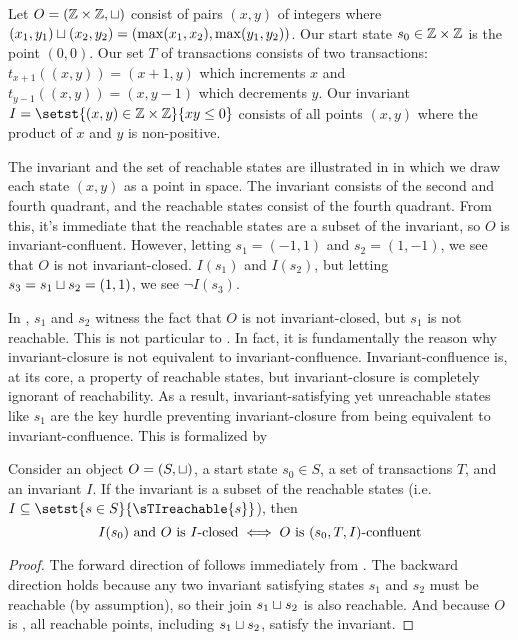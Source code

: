 \begin{example}
  Let $O = (\mathbb{Z} \times \mathbb{Z}, \sqcup)$ consist of pairs $(x, y)$ of integers
  where $(x_1, y_1) \sqcup (x_2, y_2) = (\max(x_1, x_2), \max(y_1, y_2))$. Our
  start state $s_0 \in \mathbb{Z} \times \mathbb{Z}$ is the point $(0, 0)$. Our set $T$
  of transactions consists of two transactions: $t_{x+1}((x, y)) = (x + 1, y)$
  which increments $x$ and $t_{y-1}((x, y)) = (x, y - 1)$ which decrements $y$.
  Our invariant $I = \setst{(x, y) \in \ints \times \ints}{xy \leq 0}$ consists
  of all points $(x, y)$ where the product of $x$ and $y$ is non-positive.

  The invariant and the set of reachable states are illustrated in 
  in which we draw each state $(x, y)$ as a point in space. The invariant
  consists of the second and fourth quadrant, and the reachable states consist
  of the fourth quadrant. From this, it's immediate that the reachable states
  are a subset of the invariant, so $O$ is invariant-confluent. However,
  letting $s_1 = (-1, 1)$ and $s_2 = (1, -1)$, we see that $O$ is not
  invariant-closed. $I(s_1)$ and $I(s_2)$, but letting $s_3 = s_1 \sqcup s_2 =
  (1, 1)$, we see $\lnot I(s_3)$.
\end{example}

{}

In , $s_1$ and $s_2$ witness the fact that $O$ is not
invariant-closed, but $s_1$ is not reachable. This is not particular to
. In fact, it is fundamentally the reason why invariant-closure
is not equivalent to invariant-confluence. Invariant-confluence is, at its
core, a property of reachable states, but invariant-closure is completely
ignorant of reachability. As a result, invariant-satisfying yet unreachable
states like $s_1$ are the key hurdle preventing invariant-closure from being
equivalent to invariant-confluence. This is formalized by

\begin{theorem}
  Consider an object $O = (S, \sqcup)$, a start state $s_0 \in S$, a set of
  transactions $T$, and an invariant $I$. If the invariant is a subset of the
  reachable states (i.e. $I \subseteq \setst{s \in S}{\sTIreachable{s}}$), then
  \[
    \text{$I(s_0)$ and $O$ is $I$-closed{}} \iff \text{$O$ is $(s_0, T, I)$-confluent{}}
  \]
\end{theorem}
\begin{proof}
  The forward direction of  follows
  immediately from . The backward direction
  holds because any two invariant satisfying states $s_1$ and $s_2$ must be
  reachable (by assumption), so their join $s_1 \sqcup s_2$ is also reachable.
  And because $O$ is \sTIconfluent{}, all reachable points, including $s_1
  \sqcup s_2$, satisfy the invariant.
\end{proof}

